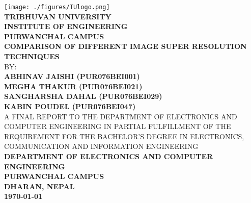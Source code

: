\thispagestyle{empty} %



{
	\thispagestyle{empty}
	\centering
	\normalsize
	  
	\texttt{[image: ./figures/TUlogo.png]}\\[0.5cm]
	{\bf{TRIBHUVAN UNIVERSITY}\\
	{INSTITUTE OF ENGINEERING}\\
	PURWANCHAL CAMPUS}
	\\[1cm]
	
	{\bf COMPARISON OF DIFFERENT IMAGE SUPER RESOLUTION TECHNIQUES}\\[1cm]
	
	BY:\\
	{\bf ABHINAV JAISHI (PUR076BEI001)}\\
	{\bf MEGHA THAKUR (PUR076BEI021)}\\
	{\bf SANGHARSHA DAHAL (PUR076BEI029)}\\
	{\bf KABIN POUDEL (PUR076BEI047)}\\[1.5cm]

	



	A FINAL REPORT TO THE DEPARTMENT OF ELECTRONICS AND COMPUTER
	ENGINEERING IN PARTIAL FULFILLMENT OF THE REQUIREMENT FOR THE BACHELOR'S
	DEGREE IN ELECTRONICS, COMMUNICATION AND INFORMATION ENGINEERING\\[0.5cm]
	
	{\bf DEPARTMENT OF ELECTRONICS AND COMPUTER ENGINEERING\\
	PURWANCHAL CAMPUS\\
	DHARAN, NEPAL}\\[1.5cm]

	{\bf\today}
	
	
}

